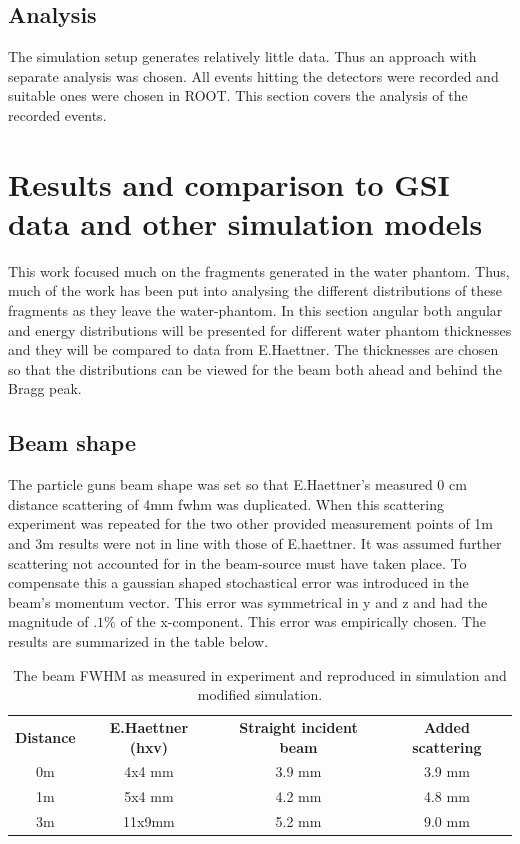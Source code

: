 \subsection{Analysis}
The simulation setup generates relatively little data. Thus an approach with separate analysis was chosen. All events hitting the detectors were recorded and suitable ones were chosen in ROOT. This section covers the analysis of the recorded events.

\section{Results and comparison to GSI data and other simulation models}

This work focused much on the fragments generated in the water phantom. Thus, much of the work has been put into analysing the different distributions of these fragments as they leave the water-phantom. In this section angular both angular and energy distributions will be presented for different water phantom thicknesses and they will be compared to data from E.Haettner. The thicknesses are chosen so that the distributions can be viewed for the beam both ahead and behind the Bragg peak.

\subsection{Beam shape\label{beamShapeAnalysis}}
The particle guns beam shape was set so that E.Haettner's measured 0 cm distance scattering of 4mm fwhm was duplicated. When this scattering experiment was repeated for the two other provided measurement points of 1m and 3m results were not in line with those of E.haettner. It was assumed further scattering not accounted for in the beam-source must have taken place. To compensate this a gaussian shaped stochastical error was introduced in the beam's momentum vector. This error was symmetrical in y and z and had the magnitude of $.1 \%$ of the x-component. This error was empirically chosen. The results are summarized in the table below.
\begin{center}
 \begin{table}[h]
\begin{tabular}{cccc} %
\textbf{Distance} & \textbf{E.Haettner (hxv)} & \textbf{Straight incident beam} & \textbf{Added scattering} \\
0m &4x4 mm& 3.9 mm & 3.9 mm\\
1m &5x4 mm & 4.2 mm & 4.8 mm\\
3m &11x9mm& 5.2 mm & 9.0 mm\\
\end{tabular} 
\caption{\label{fig:beamFWHMtable} The beam FWHM as measured in experiment and reproduced in simulation and modified simulation.}
\end{table}
\end{center}

